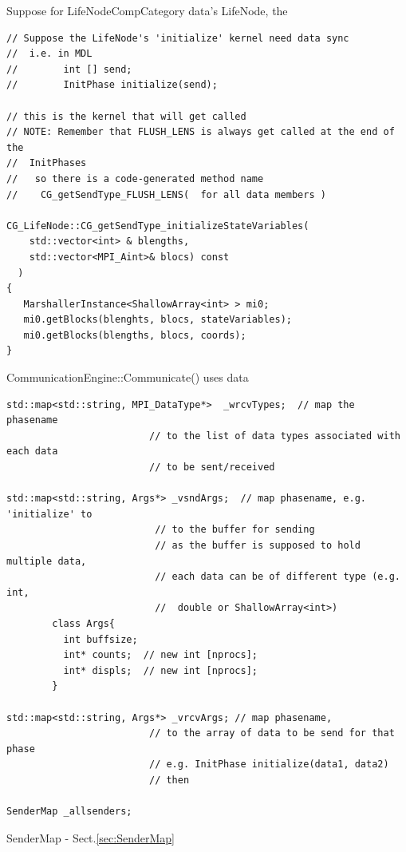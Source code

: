 Suppose for LifeNodeCompCategory data's LifeNode, the 
\begin{verbatim}
// Suppose the LifeNode's 'initialize' kernel need data sync
//  i.e. in MDL
//        int [] send;
//        InitPhase initialize(send);

// this is the kernel that will get called
// NOTE: Remember that FLUSH_LENS is always get called at the end of the
//  InitPhases
//   so there is a code-generated method name 
//    CG_getSendType_FLUSH_LENS(  for all data members )

CG_LifeNode::CG_getSendType_initializeStateVariables(
    std::vector<int> & blengths,
    std::vector<MPI_Aint>& blocs) const
  )
{
   MarshallerInstance<ShallowArray<int> > mi0;
   mi0.getBlocks(blenghts, blocs, stateVariables);
   mi0.getBlocks(blengths, blocs, coords);
}
\end{verbatim}


CommunicationEngine::Communicate() uses data
\begin{verbatim}
std::map<std::string, MPI_DataType*>  _wrcvTypes;  // map the phasename
                         // to the list of data types associated with each data
                         // to be sent/received

std::map<std::string, Args*> _vsndArgs;  // map phasename, e.g. 'initialize' to
                          // to the buffer for sending
                          // as the buffer is supposed to hold multiple data,
                          // each data can be of different type (e.g. int,
                          //  double or ShallowArray<int>)
        class Args{
          int buffsize;
          int* counts;  // new int [nprocs]; 
          int* displs;  // new int [nprocs];
        }
                          
std::map<std::string, Args*> _vrcvArgs; // map phasename, 
                         // to the array of data to be send for that phase
                         // e.g. InitPhase initialize(data1, data2)
                         // then 

SenderMap _allsenders;
\end{verbatim}
SenderMap - Sect.\ref{sec:SenderMap}


